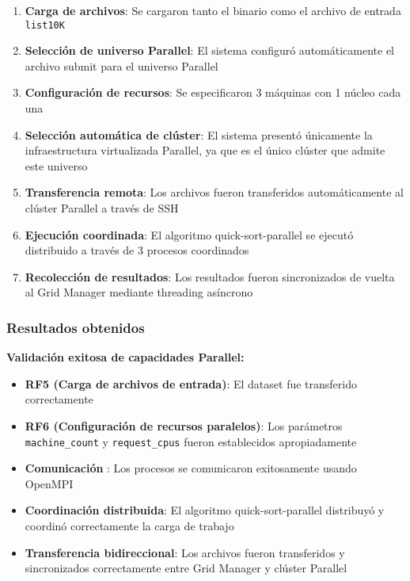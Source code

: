 \begin{enumerate}
	\item \textbf{Carga de archivos}: Se cargaron tanto el binario \MPI como el archivo de entrada \texttt{list10K}

	\item \textbf{Selección de universo Parallel}: El sistema configuró automáticamente el archivo submit para el universo Parallel

	\item \textbf{Configuración de recursos}: Se especificaron 3 máquinas con 1 núcleo cada una

	\item \textbf{Selección automática de clúster}: El sistema presentó únicamente la infraestructura virtualizada Parallel, ya que es el único clúster que admite este universo

	\item \textbf{Transferencia remota}: Los archivos fueron transferidos automáticamente al clúster Parallel a través de SSH

	\item \textbf{Ejecución coordinada}: El algoritmo quick-sort-parallel se ejecutó distribuido a través de 3 procesos \MPI coordinados

	\item \textbf{Recolección de resultados}: Los resultados fueron sincronizados de vuelta al Grid Manager mediante threading asíncrono
\end{enumerate}

\subsubsection{Resultados obtenidos}
\noindent

\textbf{Validación exitosa de capacidades Parallel:}

\begin{itemize}
	\item \textbf{RF5 (Carga de archivos de entrada)}: El dataset fue transferido correctamente
	\item \textbf{RF6 (Configuración de recursos paralelos)}: Los parámetros \texttt{machine\_count} y \texttt{request\_cpus} fueron establecidos apropiadamente
	\item \textbf{Comunicación \MPI}: Los procesos se comunicaron exitosamente usando OpenMPI
	\item \textbf{Coordinación distribuida}: El algoritmo quick-sort-parallel distribuyó y coordinó correctamente la carga de trabajo
	\item \textbf{Transferencia bidireccional}: Los archivos fueron transferidos y sincronizados correctamente entre Grid Manager y clúster Parallel
\end{itemize}

